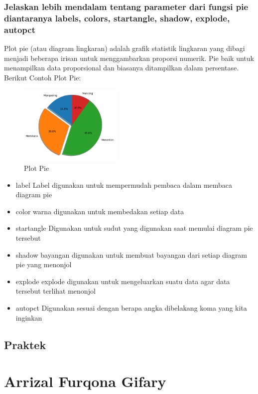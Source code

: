 \subsubsection{Jelaskan lebih mendalam tentang parameter dari fungsi pie diantaranya labels, colors, startangle, shadow, explode, autopct}
\hfill \break
Plot pie (atau diagram lingkaran) adalah grafik statistik lingkaran yang dibagi menjadi beberapa irisan untuk menggambarkan proporsi numerik. Pie baik untuk menampilkan data proporsional dan biasanya ditampilkan  dalam persentase.
Berikut Contoh Plot Pie:

\begin{figure}[H]	
    \includegraphics[width=5cm]{figures/6/1174074/Teori/plot_pie.png}
    \centering
    \caption{Plot Pie}
\end{figure}
\begin{itemize}
    \item label
    Label digunakan untuk mempermudah pembaca dalam membaca diagram pie
    \item color
    warna digunakan untuk membedakan setiap data
    \item startangle
    Digunakan untuk sudut yang digunakan saat memulai diagram pie tersebut
    \item shadow
    bayangan digunakan untuk membuat bayangan dari setiap diagram pie yang menonjol
    \item explode
    explode digunakan untuk mengeluarkan suatu data agar data tersebut terlihat menonjol
    \item autopct
    Digunakan sesuai dengan berapa angka dibelakang koma yang kita inginkan
\end{itemize}
\subsection{Praktek}
\section{Arrizal Furqona Gifary}

